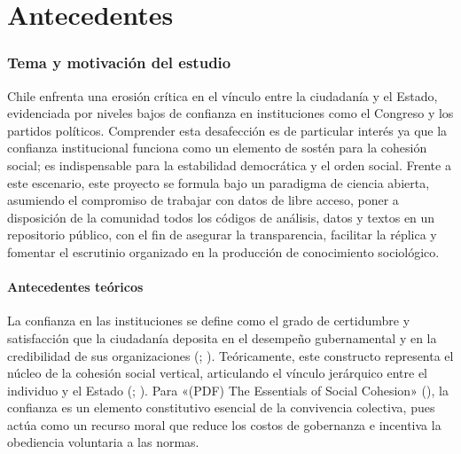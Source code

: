 \documentclass[
  spanish,
  a4paper,
  oneside]{scrbook}
\begin{document}

\chapter{Antecedentes}\label{antecedentes}

\subsection{Tema y motivación del
estudio}\label{tema-y-motivaciuxf3n-del-estudio}

Chile enfrenta una erosión crítica en el vínculo entre la ciudadanía y
el Estado, evidenciada por niveles bajos de confianza en instituciones
como el Congreso y los partidos políticos. Comprender esta desafección
es de particular interés ya que la confianza institucional funciona como
un elemento de sostén para la cohesión social; es indispensable para la
estabilidad democrática y el orden social. Frente a este escenario, este
proyecto se formula bajo un paradigma de ciencia abierta, asumiendo el
compromiso de trabajar con datos de libre acceso, poner a disposición de
la comunidad todos los códigos de análisis, datos y textos en un
repositorio público, con el fin de asegurar la transparencia, facilitar
la réplica y fomentar el escrutinio organizado en la producción de
conocimiento sociológico.

\subsubsection{Antecedentes teóricos}\label{antecedentes-teuxf3ricos}

La confianza en las instituciones se define como el grado de certidumbre
y satisfacción que la ciudadanía deposita en el desempeño gubernamental
y en la credibilidad de sus organizaciones
(;
). Teóricamente, este constructo representa
el núcleo de la cohesión social vertical, articulando el vínculo
jerárquico entre el individuo y el Estado
(;
). Para {«({PDF}) {The Essentials}
of {Social Cohesion}»} (), la
confianza es un elemento constitutivo esencial de la convivencia
colectiva, pues actúa como un recurso moral que reduce los costos de
gobernanza e incentiva la obediencia voluntaria a las normas.
\end{document}
